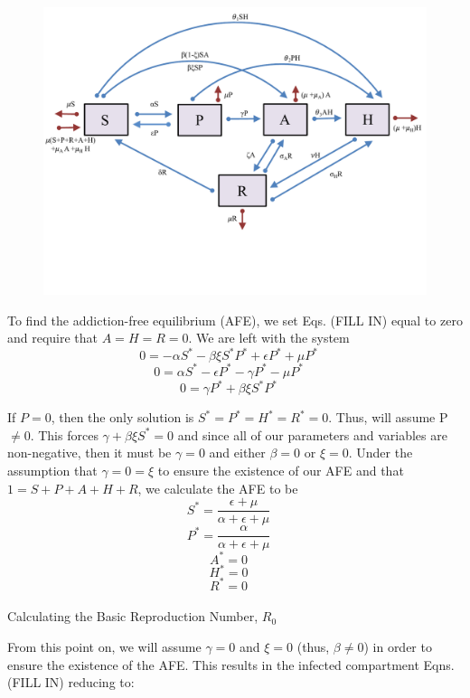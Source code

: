 \documentclass[12pt]{article}
\begin{document}
\begin{center}
\begin{figure}
\includegraphics[scale=0.56]{heroin_schematic.pdf}
\end{figure}
\end{center}


To find the addiction-free equilibrium (AFE), we set Eqs. (FILL IN) equal to zero and require that $A=H=R=0$. We are left with the system \\

\[0=-\alpha S^* -\beta \xi S^* P^* + \epsilon P^* +\mu P^* \quad\]
\[0=\alpha S^* - \epsilon P^* -\gamma P^* - \mu P^* \quad\]
\[0=\gamma P^* + \beta \xi S^* P^*   \quad\]



If $P=0$, then the only solution is $S^*=P^*=H^*=R^*=0$. Thus, will assume P $\neq 0. $ This forces $\gamma + \beta \xi S^* =0$ and since all of our parameters and variables are non-negative, then it must be $\gamma=0$ and either $\beta=0$ or $\xi=0$. Under the assumption that $\gamma=0=\xi$ to ensure the existence of our AFE and that $1=S+P+A+H+R$, we calculate the AFE to be \\

\[S^*=\frac{\epsilon + \mu}{\alpha + \epsilon +\mu}\quad\]
\[P^*=\frac{\alpha}{\alpha + \epsilon +\mu}\quad\]
\[A^*=0\quad\]
\[H^*=0\quad\]
\[R^*=0\quad\] \\




Calculating the Basic Reproduction Number, $R_0$

From this point on, we will assume $\gamma =0$ and $\xi =0$ (thus, $\beta \neq 0$) in order to ensure the existence of the AFE. This results in the infected compartment Eqns. (FILL IN) reducing to:
\end{document}

